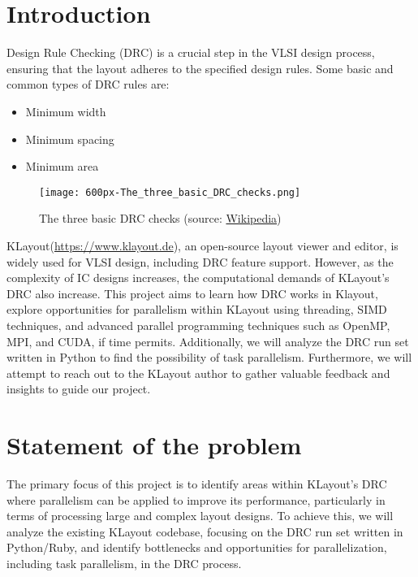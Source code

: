 \documentclass[sigconf]{acmart}
\begin{document}

\maketitle

\section{Introduction}
Design Rule Checking (DRC) is a crucial step in the VLSI design process, ensuring that the layout adheres to the specified design rules. Some basic and common types of DRC rules are:

\begin{itemize}
\item Minimum width
\item Minimum spacing 
\item Minimum area 
\end{itemize}


\begin{figure}[h]
  \centering
  \texttt{[image: 600px-The\_three\_basic\_DRC\_checks.png]}
  \caption{The three basic DRC checks (source: \href{https://upload.wikimedia.org/wikipedia/commons/thumb/5/5a/The_three_basic_DRC_checks.svg/600px-The_three_basic_DRC_checks.svg.png}{Wikipedia})}
  \label{fig:basic_drc_checks}
\end{figure}

KLayout(\href{https://www.klayout.de/}{https://www.klayout.de}), an open-source layout viewer and editor, is widely used for VLSI design, including DRC feature support. However, as the complexity of IC designs increases, the computational demands of KLayout's DRC also increase. This project aims to learn how DRC works in Klayout, explore opportunities for parallelism within KLayout using threading, SIMD techniques, and advanced parallel programming techniques such as OpenMP, MPI, and CUDA, if time permits. Additionally, we will analyze the DRC run set written in Python to find the possibility of task parallelism. Furthermore, we will attempt to reach out to the KLayout author to gather valuable feedback and insights to guide our project.


\section{Statement of the problem}
The primary focus of this project is to identify areas within KLayout's DRC where parallelism can be applied to improve its performance, particularly in terms of processing large and complex layout designs. To achieve this, we will analyze the existing KLayout codebase, focusing on the DRC run set written in Python/Ruby, and identify bottlenecks and opportunities for parallelization, including task parallelism, in the DRC process.
\end{document}
